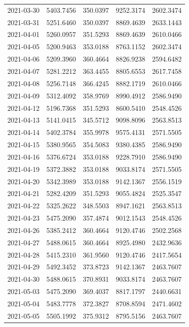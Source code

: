 \begin{footnotesize}
\begin{longtable}{lllll}
2021-03-30 & 5403.7456 & 350.0397 & 9252.3174 & 2602.3474 \\
2021-03-31 & 5251.6460 & 350.0397 & 8869.4639 & 2633.1443 \\
2021-04-01 & 5260.0957 & 351.5293 & 8869.4639 & 2610.0466 \\
2021-04-05 & 5200.9463 & 353.0188 & 8763.1152 & 2602.3474 \\
2021-04-06 & 5209.3960 & 360.4664 & 8826.9238 & 2594.6482 \\
2021-04-07 & 5281.2212 & 363.4455 & 8805.6553 & 2617.7458 \\
2021-04-08 & 5256.7148 & 366.4245 & 8882.1719 & 2610.0466 \\
2021-04-09 & 5312.4092 & 358.9769 & 8990.4912 & 2586.9490 \\
2021-04-12 & 5196.7368 & 351.5293 & 8600.5410 & 2548.4526 \\
2021-04-13 & 5141.0415 & 345.5712 & 9098.8096 & 2563.8513 \\
2021-04-14 & 5402.3784 & 355.9978 & 9575.4131 & 2571.5505 \\
2021-04-15 & 5380.9565 & 354.5083 & 9380.4385 & 2586.9490 \\
2021-04-16 & 5376.6724 & 353.0188 & 9228.7910 & 2586.9490 \\
2021-04-19 & 5372.3882 & 353.0188 & 9033.8174 & 2571.5505 \\
2021-04-20 & 5342.3989 & 353.0188 & 9142.1367 & 2556.1519 \\
2021-04-21 & 5282.4209 & 351.5293 & 9055.4824 & 2525.3547 \\
2021-04-22 & 5325.2622 & 348.5503 & 8947.1621 & 2563.8513 \\
2021-04-23 & 5475.2090 & 357.4874 & 9012.1543 & 2548.4526 \\
2021-04-26 & 5385.2412 & 360.4664 & 9120.4746 & 2502.2568 \\
2021-04-27 & 5488.0615 & 360.4664 & 8925.4980 & 2432.9636 \\
2021-04-28 & 5415.2310 & 361.9560 & 9120.4746 & 2417.5654 \\
2021-04-29 & 5492.3452 & 373.8723 & 9142.1367 & 2463.7607 \\
2021-04-30 & 5488.0615 & 370.8931 & 9033.8174 & 2463.7607 \\
2021-05-03 & 5475.2090 & 369.4037 & 8817.1797 & 2440.6631 \\
2021-05-04 & 5483.7778 & 372.3827 & 8708.8594 & 2471.4602 \\
2021-05-05 & 5505.1992 & 375.9312 & 8795.5156 & 2463.7607 \\

\end{longtable}
\end{footnotesize}
